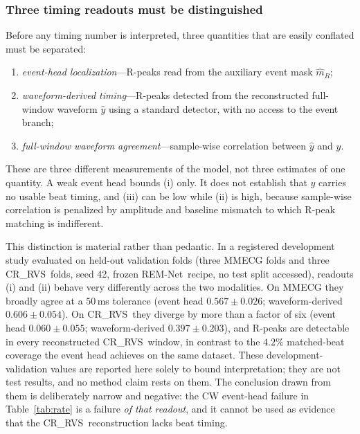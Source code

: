 \documentclass[lettersize,journal]{IEEEtran}
\newcommand{\remnet}{REM-Net\xspace}
\newcommand{\crrvs}{CR\_RVS\xspace}
\begin{document}
\subsubsection{Three timing readouts must be distinguished}
\label{sec:timing_readouts}
Before any timing number is interpreted, three quantities that are easily conflated must be separated:
\begin{enumerate}
    \item \emph{event-head localization}---R-peaks read from the auxiliary event mask $\hat{m}_R$;
    \item \emph{waveform-derived timing}---R-peaks detected from the reconstructed full-window waveform $\hat{y}$ using a standard detector, with no access to the event branch;
    \item \emph{full-window waveform agreement}---sample-wise correlation between $\hat{y}$ and $y$.
\end{enumerate}
These are three different measurements of the model, not three estimates of one quantity. A weak event head bounds (i) only. It does not establish that $\hat{y}$ carries no usable beat timing, and (iii) can be low while (ii) is high, because sample-wise correlation is penalized by amplitude and baseline mismatch to which R-peak matching is indifferent.

This distinction is material rather than pedantic. In a registered development study evaluated on held-out validation folds (three MMECG folds and three \crrvs\ folds, seed 42, frozen \remnet\ recipe, no test split accessed), readouts (i) and (ii) behave very differently across the two modalities. On MMECG they broadly agree at a $50$\,ms tolerance (event head $0.567 \pm 0.026$; waveform-derived $0.606 \pm 0.054$). On \crrvs\ they diverge by more than a factor of six (event head $0.060 \pm 0.055$; waveform-derived $0.397 \pm 0.203$), and R-peaks are detectable in every reconstructed \crrvs\ window, in contrast to the $4.2\%$ matched-beat coverage the event head achieves on the same dataset. These development-validation values are reported here solely to bound interpretation; they are not test results, and no method claim rests on them. The conclusion drawn from them is deliberately narrow and negative: the CW event-head failure in Table~\ref{tab:rate} is a failure \emph{of that readout}, and it cannot be used as evidence that the \crrvs\ reconstruction lacks beat timing.
\end{document}
